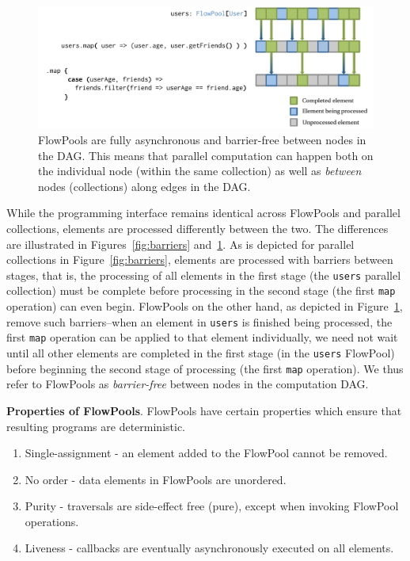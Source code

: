 \begin{figure}[!ht]
\centering
\includegraphics[width=\textwidth]{images/barrier-free}
\caption{FlowPools are fully asynchronous and barrier-free between nodes in the
DAG. This means that parallel computation can happen both on the individual node
(within the same collection) as well as {\em between} nodes (collections) along
edges in the DAG.}
\label{fig:barrier-free}
\end{figure}

While the programming interface remains identical across FlowPools and parallel
collections, elements are processed differently between the two. The differences
are illustrated in Figures~\ref{fig:barriers} and~\ref{fig:barrier-free}. As is
depicted for parallel collections in Figure~\ref{fig:barriers}, elements are
processed with barriers between stages, that is, the processing of all elements
in the first stage (the \verb|users| parallel collection) must be complete
before processing in the second stage (the first \verb|map| operation) can even
begin. FlowPools on the other hand, as depicted in
Figure~\ref{fig:barrier-free}, remove such barriers--when an element in
\verb|users| is finished being processed, the first \verb|map| operation can be
applied to that element individually, we need not wait until all other elements
are completed in the first stage (in the \verb|users| FlowPool) before beginning
the second stage of processing (the first \verb|map| operation). We thus refer
to FlowPools as {\em barrier-free} between nodes in the computation DAG.

\textbf{Properties of FlowPools}. FlowPools have certain properties
which ensure that resulting programs are deterministic.

\begin{enumerate}
\item Single-assignment - an element added to the FlowPool cannot be removed.
\item No order - data elements in FlowPools are unordered.
\item Purity - traversals are side-effect free (pure), except when invoking FlowPool operations.
\item Liveness - callbacks are eventually asynchronously executed on all elements.
\end{enumerate}

